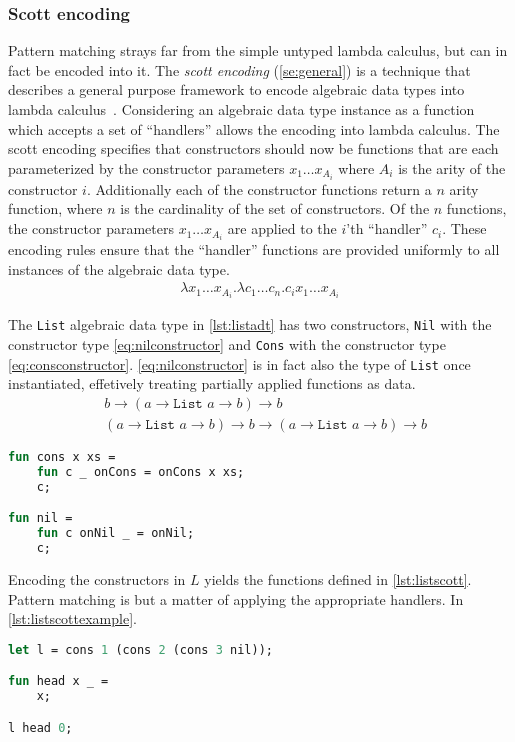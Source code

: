 \documentclass[11pt,oneside,a4paper]{report}
\begin{document}
\subsubsection{Scott encoding}
Pattern matching strays far from the simple untyped lambda calculus, but can in fact be encoded into it.
The \textit{scott encoding} (\autoref{se:general}) is a technique that describes a general purpose framework to encode algebraic data types into lambda calculus~\cite{scott1962system}.
Considering an algebraic data type instance as a function which accepts a set of ``handlers'' allows the encoding into lambda calculus.
The scott encoding specifies that constructors should now be functions that are each parameterized by the constructor parameters $x_1 \dots x_{A_i}$ where $A_i$ is the arity of the constructor $i$.
Additionally each of the constructor functions return a $n$ arity function, where $n$ is the cardinality of the set of constructors.
Of the $n$ functions, the constructor parameters $x_1 \dots x_{A_i}$ are applied to the $i$'th ``handler'' $c_i$.
These encoding rules ensure that the ``handler'' functions are provided uniformly to all instances of the algebraic data type.
\begin{align}
    \lambda x_1 \dots x_{A_i}. \lambda c_1 \dots c_n. c_i x_1 \dots x_{A_i}
\label{se:general}
\end{align}
\begin{exmp}
    The \texttt{List} algebraic data type in \autoref{lst:listadt} has two constructors, \texttt{Nil} with the constructor type \autoref{eq:nilconstructor} and \texttt{Cons} with the constructor type \autoref{eq:consconstructor}.
    \autoref{eq:nilconstructor} is in fact also the type of \texttt{List} once instantiated, effetively treating partially applied functions as data.
\begin{align}
   &b \rightarrow (a \rightarrow \texttt{List } a \rightarrow b) \rightarrow b
   \label{eq:nilconstructor}\\
   &(a \rightarrow \texttt{List } a \rightarrow b) \rightarrow b \rightarrow (a \rightarrow \texttt{List } a \rightarrow b) \rightarrow b
   \label{eq:consconstructor}
\end{align}
\begin{lstlisting}[float,language=ML,caption={List algebraic data type implementation},label={lst:listscott}]
fun cons x xs = 
    fun c _ onCons = onCons x xs;
    c;

fun nil = 
    fun c onNil _ = onNil;
    c;
\end{lstlisting}
Encoding the constructors in $L$ yields the functions defined in \autoref{lst:listscott}.
Pattern matching is but a matter of applying the appropriate handlers.
In \autoref{lst:listscottexample}.
\begin{lstlisting}[float,language=ML,caption={Example of scott encoded list algebraic data type},label={lst:listscottexample}]
let l = cons 1 (cons 2 (cons 3 nil));

fun head x _ = 
    x;

l head 0;
\end{lstlisting}
\end{exmp}
\end{document}
